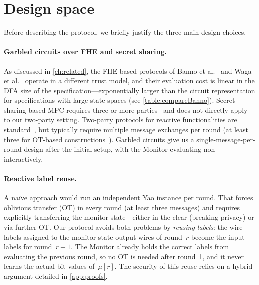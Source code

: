 \section{Design space}\label{sec:designspace}

Before describing the protocol, we briefly justify the three main design choices.

\paragraph{Garbled circuits over FHE and secret sharing.}
As discussed in \cref{ch:related}, the FHE-based protocols of Banno et al.~\cite{BMMBWS22} and Waga et al.~\cite{WMSMBBS24} operate in a different trust model, and their evaluation cost is linear in the DFA size of the specification---exponentially larger than the circuit representation for specifications with large state spaces (see \cref{table:compareBanno}). Secret-sharing-based MPC requires three or more parties~\cite{GMW87} and does not directly apply to our two-party setting. Two-party protocols for reactive functionalities are standard~\cite{HL10}, but typically require multiple message exchanges per round (at least three for OT-based constructions~\cite{CSW20}). Garbled circuits give us a single-message-per-round design after the initial setup, with the Monitor evaluating non-interactively.

\paragraph{Reactive label reuse.}
A naïve approach would run an independent Yao instance per round. That forces oblivious transfer (OT) in every round (at least three messages) and requires explicitly transferring the monitor state---either in the clear (breaking privacy) or via further OT. Our protocol avoids both problems by \emph{reusing labels}: the wire labels assigned to the monitor-state output wires of round~$r$ become the input labels for round~$r{+}1$. The Monitor already holds the correct labels from evaluating the previous round, so no OT is needed after round~1, and it never learns the actual bit values of~$\mu[r]$. The security of this reuse relies on a hybrid argument detailed in \cref{app:proofs}.

